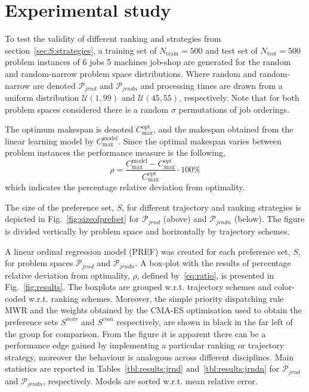 \documentclass{svjour3}                     %
\begin{document}
\section{Experimental study}\label{sec:expr:locallin}

To test the validity of different ranking and strategies from section~\ref{sec:S:strategies}, a training set of \mbox{$N_{\text{train}}=500$} and test set of $N_{\text{test}}=500$ problem instances of 6 jobs 5 machines job-shop are generated for the random and random-narrow problem space distributions. Where random and random-narrow are denoted $\mathcal{P}_{jrnd}$ and $\mathcal{P}_{jrndn}$ and processing times are drawn from a uniform distribution $\mathcal{U}(1,99)$ and $\mathcal{U}(45,55)$, respectively. Note that for both problem spaces considered there is a random $\sigma$ permutations of job orderings. 

The optimum makespan is denoted 
$C_{\max}^{\text{opt}}$, and the makespan obtained from the linear learning model by $C_{\max}^{\text{model}}$. Since 
the optimal makespan varies between problem instances the performance measure is the following, 
\begin{equation}\label{eq:ratio}\rho=\frac{C_{\max}^{\text{model}}-C_{\max}^{opt}}{C_{\max}^{\text{opt}}}\cdot 
100\%\end{equation}
which indicates the percentage relative deviation from optimality. 

The size of the preference set, $S$, for different trajectory and ranking strategies is depicted in Fig.~\ref{fig:sizeofprefset} for $\mathcal{P}_{jrnd}$ (above) and $\mathcal{P}_{jrndn}$ (below). 
The figure is divided vertically by problem space and horizontally by trajectory schemes.
 

A linear ordinal regression model (PREF) was created for each preference set, $S$, for problem spaces $\mathcal{P}_{jrnd}$ and $\mathcal{P}_{jrndn}$. A box-plot with the results of percentage relative deviation from optimality, $\rho$, defined by~\eqref{eq:ratio}, is presented in Fig.~\ref{fig:results}. The boxplots are grouped w.r.t. trajectory schemes and color-coded w.r.t. ranking schemes. 
Moreover, the simple priority dispatching rule MWR and the weights obtained by the CMA-ES optimisation used to obtain the preference sets $S^{mwr}$ and $S^{cma}$ respectively, are shown in black in the far left of the group for comparison.
From the figure it is apparent there can be a performance edge gained by implementing a particular ranking or trajectory strategy, moreover the behaviour is analogous across different disciplines. 
Main statistics are reported in Tables~\ref{tbl:results:jrnd} and~\ref{tbl:results:jrndn} for $\mathcal{P}_{jrnd}$ and $\mathcal{P}_{jrndn}$, respectively. Models are sorted w.r.t. mean relative error.
\end{document}
